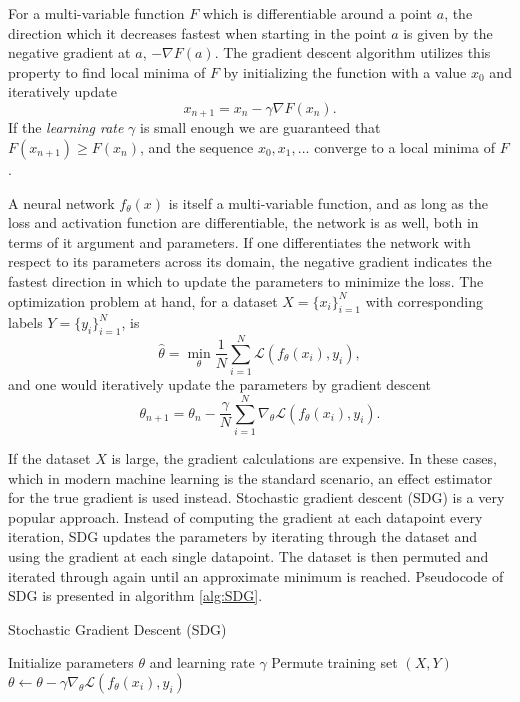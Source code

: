 \documentclass[../../thesis.tex]{subfiles}
\begin{document}
For a multi-variable function $F$ which is differentiable around a point $a$, the direction which it decreases fastest when starting in the point $a$ is given by the negative gradient at $a$, $-\nabla F(a)$. The gradient descent algorithm utilizes this property to find local minima of $F$ by initializing the function with a value $x_0$ and iteratively update 
\[
    x_{n+1} = x_{n} -\gamma \nabla F(x_{n}).
\] 
If the \textit{learning rate} $\gamma$ is small enough we are guaranteed that $F(x_{n+1})\geq F(x_{n})$, and the sequence $x_0,x_1,\dots$ converge to a local minima of $F$.\newline

A neural network $f_\theta(x)$ is itself a multi-variable function, and as long as the loss and activation function are differentiable, the network is as well, both in terms of it argument and parameters. If one differentiates the network with respect to its parameters across its domain, the negative gradient indicates the fastest direction in which to update the parameters to minimize the loss. The optimization problem at hand, for a dataset $X = \{x_i\}_{i=1}^N$ with corresponding labels $Y = \{y_i\}_{i=1}^N$, is
\[
   \widehat{\theta} = \min_{\theta} \frac{1}{N}\sum_{i=1}^N \mathcal{L}(f_\theta(x_i),y_i),
\]
and one would iteratively update the parameters by gradient descent 
\[
    \theta_{n+1} = \theta_{n} - \frac{\gamma}{N}\sum_{i=1}^N\nabla_\theta \mathcal{L}(f_\theta(x_i),y_i).
\]

If the dataset $X$ is large, the gradient calculations are expensive. In these cases, which in modern machine learning is the standard scenario, an effect estimator for the true gradient is used instead. Stochastic gradient descent (SDG) is a very popular approach. Instead of computing the gradient at each datapoint every iteration, SDG updates the parameters by iterating through the dataset and using the gradient at each single datapoint. The dataset is then permuted and iterated through again until an approximate minimum is reached. Pseudocode of SDG is presented in algorithm \ref{alg:SDG}.

\begin{algorithm}
\caption{Stochastic Gradient Descent (SDG)}
\label{alg:SDG}
\begin{algorithmic}
    \State Initialize parameters $\theta$ and learning rate $\gamma$
        \State Permute training set $(X,Y)$
        \State $\theta \gets \theta - \gamma\nabla_\theta \mathcal{L}(f_\theta(x_i),y_i)$
    \EndFor
    \EndWhile
\end{algorithmic}
\end{algorithm}
\end{document}
